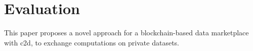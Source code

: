\chapter{Evaluation}
\label{cha:evaluation}

This paper proposes a novel approach for a blockchain-based data marketplace with \acrfull{c2d}, to exchange computations on private datasets. 





